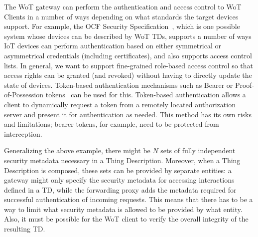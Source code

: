 The WoT gateway can perform the authentication and access control to WoT Clients 
in a number of ways depending on what standards the target devices support.
For example, the OCF Security Specification~\cite{ocf2017}, which is one possible
system whose devices can be described by WoT TDs, 
supports a number of ways IoT devices can perform authentication based on 
either symmetrical or asymmetrical credentials (including certificates),
and also supports access control lists.
In general, we want to support fine-grained role-based access control
so that access rights can be granted (and revoked) without having to directly
update the state of devices.
Token-based authentication mechanisms
such as Bearer or Proof-of-Possession tokens~\cite{ace2017} can be used for this.
Token-based authentication allows  
a client to dynamically request a token from a remotely 
located authorization server and present it for 
authentication as needed.
This method has its own risks and limitations;
bearer tokens, for example, need to be protected from interception.

Generalizing the above example, 
there might be $N$ sets of fully independent security metadata
necessary in a Thing Description.
Moreover, when a Thing Description is composed, 
these sets can be provided by separate entities: 
a gateway might only specify the security metadata for accessing interactions defined in a TD,
while the forwarding proxy adds the metadata required for successful authentication of incoming requests.
This means that there has to be a way to limit what security metadata 
is allowed to be provided by what entity.
Also, it must be possible for the WoT client to verify the overall integrity of the resulting TD. 
 

